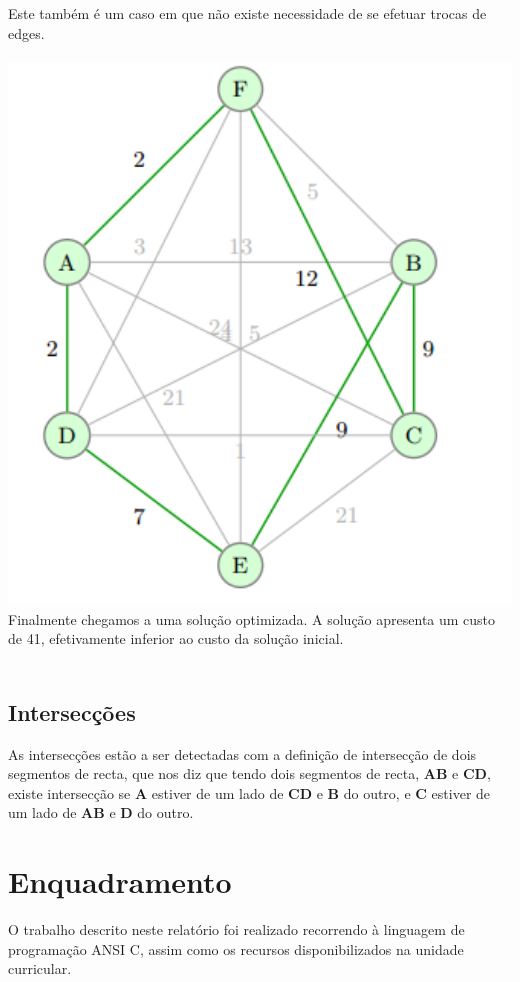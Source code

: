 \documentclass[12pt,a4paper,portrait]{article}
\begin{document}
			Este também é um caso em que não existe necessidade de se efetuar trocas de edges.\\\\
			\includegraphics[width=1.0\textwidth]{imagens/9}
			Finalmente chegamos a uma solução optimizada. A solução apresenta um custo de 41, efetivamente inferior ao custo da solução inicial.\\\\
			\newpage
			\subsection{Intersecções}
			As intersecções estão a ser detectadas com a definição de intersecção de dois segmentos de recta, que nos diz que tendo dois segmentos de recta, \textbf{AB} e \textbf{CD}, existe intersecção se \textbf{A} estiver de um lado de \textbf{CD} e \textbf{B} do outro, e \textbf{C} estiver de um lado de \textbf{AB} e \textbf{D} do outro.
	\section{Enquadramento}
	O trabalho descrito neste relatório foi realizado recorrendo à linguagem de programação ANSI C, assim como os recursos disponibilizados na unidade curricular.\\
\end{document}
